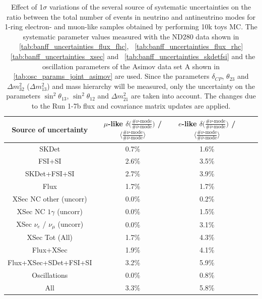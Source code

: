 \begin{table}
\center
\begin{tabular}{| c || c | c || c | c |}
\hline
Source of uncertainty 
&$\mu$-like ${\delta} \Big( \frac{\# {\nu} \text{-mode}}{\# {\bar{\nu}} \text{-mode} } \Big) $ / $\Big \langle \frac{\# {\nu} \text{-mode}}{\# {\bar{\nu}} \text{-mode} } \Big \rangle$ 
&$e$-like ${\delta} \Big( \frac{\# {\nu} \text{-mode}}{\# {\bar{\nu}} \text{-mode} } \Big) $ / $\Big \langle \frac{\# {\nu} \text{-mode}}{\# {\bar{\nu}} \text{-mode} } \Big \rangle$ \\


\hline
\hline
SKDet 							& 0.7\%  	& 1.6\% \\ \hline
FSI+SI 	 						& 2.6\% 	& 3.5\% \\ \hline
SKDet+FSI+SI 						& 2.7\% 	& 3.9\% \\ \hline
\hline
Flux 								& 1.7\% 	& 1.7\% \\ \hline
XSec NC other (uncorr)  				& 0.0\% 	& 0.2\% \\ \hline
XSec NC $1\gamma$ (uncorr) 			& 0.0\%  	& 1.5\% \\ \hline
XSec $\nu_e$ / $\nu_{\mu}$ (uncorr)  	& 0.0\%  	& 3.1\% \\ \hline
XSec Tot (All)							& 1.7\%  	& 4.3\% \\ \hline
 \hline
Flux+XSec 						& 1.9\%  	& 4.1\% \\ \hline
 \hline
Flux+XSec+SDet+FSI+SI 				& 3.2\%  	& 5.9\% \\ \hline
 \hline
Oscillations 						& 0.0\% 	& 0.8\% \\ \hline
 \hline
All 								& 3.3\%  	& 5.8\% \\ \hline
\end{tabular}
\caption{
 Effect of 1$\sigma$ variations of the several source of systematic uncertainties 
 on the ratio between the
 total number of events in neutrino and antineutrino modes
 for 1-ring electron- and muon-like samples
 obtained by performing 10k toys MC.
 The systematic parameter values measured with the ND280 data 
shown in 
\cref{tab:banff_uncertainties_flux_fhc},
~\ref{tab:banff_uncertainties_flux_rhc}
~\ref{tab:banff_uncertainties_xsec}
and
~\ref{tab:banff_uncertainties_skdetfsi}
and the oscillation parameters of the Asimov data set A shown in \cref{tab:osc_params_joint_asimov}
are used.
Since the parameters $\delta_{CP}$, $\theta_{23}$ and $\Delta m^2_{32}$ ($\Delta m^2_{13}$) and mass hierarchy
will be measured,
only the uncertainty on the parameters 
$\sin^2 \theta_{13}$,
$\sin^2 \theta_{12}$
and 
$\Delta m^2_{21}$ 
are taken into account.
The changes due to the Run 1-7b flux and covariance matrix updates are applied.
}             
\label{tab:ratio_systematic_table_summary_asimov_A_Run17b}                                                                                                                                                                             
\end{table}
